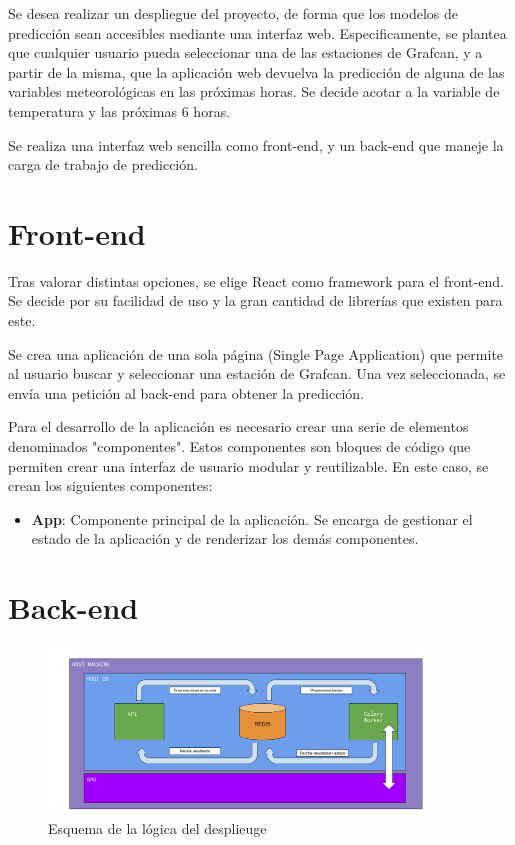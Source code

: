 
Se desea realizar un despliegue del proyecto, de forma que los modelos de predicción sean accesibles mediante una interfaz web. Especificamente, se plantea que cualquier usuario 
pueda seleccionar una de las estaciones de Grafcan, y a partir de la misma, que la aplicación web devuelva la predicción de alguna de las variables meteorológicas en las próximas horas. 
Se decide acotar a la variable de temperatura y las próximas 6 horas.

Se realiza una interfaz web sencilla como front-end, y un back-end que maneje la carga de trabajo de predicción.

\section{Front-end}
Tras valorar distintas opciones, se elige React como framework para el front-end. Se decide por su facilidad de uso y la gran cantidad de librerías que existen para este.

Se crea una aplicación de una sola página (Single Page Application) que permite al usuario buscar y seleccionar una estación de Grafcan. Una vez seleccionada,
se envía una petición al back-end para obtener la predicción.

Para el desarrollo de la aplicación es necesario crear una serie de elementos denominados "componentes". Estos componentes son bloques de código que 
permiten crear una interfaz de usuario modular y reutilizable. En este caso, se crean los siguientes componentes:
\begin{itemize}
    \item \textbf{App}: Componente principal de la aplicación. Se encarga de gestionar el estado de la aplicación y de renderizar los demás componentes.
  
\end{itemize}


\section{Back-end}

\begin{figure}[H]
    \centering
    \includegraphics[width=0.9\textwidth]{images/esquema_despliegue.png}
    \caption{Esquema de la lógica del desplieuge}
    \label{deploy_scheme}
\end{figure}